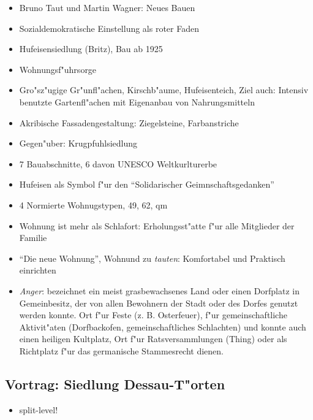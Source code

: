 \documentclass[emulatestandardclasses]{scrartcl}
\begin{document}
\begin{itemize}
  \item Bruno Taut und Martin Wagner: Neues Bauen
  \item Sozialdemokratische Einstellung als roter Faden
  \item Hufeisensiedlung (Britz), Bau ab 1925
  \item Wohnungsf"uhrsorge
  \item Gro"sz"ugige Gr"unfl"achen, Kirschb"aume, Hufeisenteich, Ziel auch: Intensiv benutzte Gartenfl"achen mit Eigenanbau von Nahrungsmitteln
  \item Akribische Fassadengestaltung: Ziegelsteine, Farbanstriche
  \item Gegen"uber: Krugpfuhlsiedlung
  \item 7 Bauabschnitte, 6 davon UNESCO Weltkurlturerbe
  \item Hufeisen als Symbol f"ur den "`Solidarischer Geimnschaftsgedanken"'
  \item 4 Normierte Wohnugstypen, 49, 62, qm
  \item Wohnung ist mehr als Schlafort: Erholungsst"atte f"ur alle Mitglieder der Familie
  \item "`Die neue Wohnung"', Wohnund zu \emph{tauten}: Komfortabel und Praktisch einrichten
  \item \emph{Anger}: bezeichnet ein meist grasbewachsenes Land oder einen Dorfplatz in Gemeinbesitz, der von allen Bewohnern der Stadt oder des Dorfes genutzt werden konnte.  Ort f"ur Feste (z. B. Osterfeuer), f"ur gemeinschaftliche Aktivit"aten (Dorfbackofen, gemeinschaftliches Schlachten) und konnte auch einen heiligen Kultplatz, Ort f"ur Ratsversammlungen (Thing) oder als Richtplatz f"ur das germanische Stammesrecht dienen. 
\end{itemize}


\subsection{Vortrag: Siedlung Dessau-T"orten}

\begin{itemize}
  \item split-level!
\end{itemize}
\end{document}
